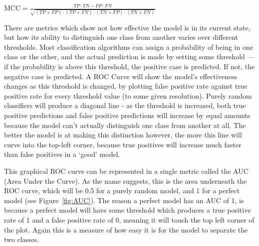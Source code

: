 $\mbox{MCC} = \frac{TP \cdot TN - FP \cdot FN}{\sqrt{(TP + FP) \cdot (TP + FN) \cdot (TN + FP) \cdot (TN + FN)}}$

There are metrics which show not how effective the model is in its current state, but how its ability to distinguish one class from another varies over different thresholds. Most classification algorithms can assign a probability of being in one class or the other, and the actual prediction is made by setting some threshold --- if the probability is above this threshold, the positive case is predicted. If not, the negative case is predicted. A ROC Curve will show the model's effectiveness changes as this threshold is changed, by plotting false positive rate against true positive rate for every threshold value (to some given resolution). Purely random classifiers will produce a diagonal line - as the threshold is increased, both true positive predictions and false positive predictions will increase by equal amounts because the model can't actually distinguish one class from another at all. The better the model is at making this distinction however, the more this line will curve into the top-left corner, because true positives will increase much faster than false positives in a `good' model.

This graphical ROC curve can be represented in a single metric called the AUC (Area Under the Curve). As the name suggests, this is the area underneath the ROC curve, which will be 0.5 for a purely random model, and 1 for a perfect model (see Figure~\ref{fig:AUC}). The reason a perfect model has an AUC of 1, is because a perfect model will have some threshold which produces a true positive rate of 1 and a false positive rate of 0, meaning it will touch the top left corner of the plot. Again this is a measure of how easy it is for the model to separate the two classes.

